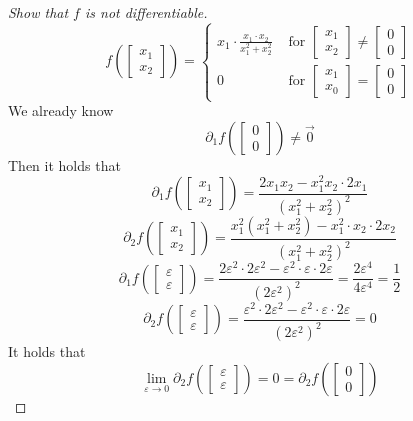 \documentclass[a4paper,landscape,twocolumn]{article}
\theoremstyle{definition}
\begin{document}
\begin{proof}[Show that $f$ is not differentiable]
  \[ f(\begin{bmatrix} x_1 \\ x_2 \end{bmatrix}) = \begin{cases}
    x_1 \cdot \frac{x_1 \cdot x_2}{x_1^2 + x_2^2}  & \text{ for } \begin{bmatrix} x_1 \\ x_2 \end{bmatrix} \neq \begin{bmatrix} 0 \\ 0 \end{bmatrix} \\
    0  & \text{ for } \begin{bmatrix} x_1 \\ x_0 \end{bmatrix} = \begin{bmatrix} 0 \\ 0 \end{bmatrix}
  \end{cases}
  \]
  We already know
  \[ \partial_1 f(\begin{bmatrix} 0 \\ 0 \end{bmatrix}) \neq \vec{0} \]
  Then it holds that
  \[ \partial_1 f(\begin{bmatrix} x_1 \\ x_2 \end{bmatrix}) = \frac{2 x_1 x_2 - x_1^2 x_2 \cdot 2x_1}{(x_1^2 + x_2^2)^2} \]
  \[ \partial_2 f(\begin{bmatrix} x_1 \\ x_2 \end{bmatrix}) = \frac{x_1^2 (x_1^2 + x_2^2) - x_1^2 \cdot x_2 \cdot 2x_2}{(x_1^2 + x_2^2)^2} \]
  \[ \partial_1 f(\begin{bmatrix} \varepsilon \\ \varepsilon \end{bmatrix}) =
    \frac{2 \varepsilon^2 \cdot 2 \varepsilon^2 - \varepsilon^2 \cdot \varepsilon \cdot 2\varepsilon}{(2 \varepsilon^2)^2} = \frac{2\varepsilon^4}{4 \varepsilon^4} = \frac12 \]
  \[ \partial_2 f(\begin{bmatrix} \varepsilon \\ \varepsilon \end{bmatrix}) = \frac{\varepsilon^2 \cdot 2\varepsilon^2 - \varepsilon^2 \cdot \varepsilon \cdot 2\varepsilon}{(2\varepsilon^2)^2} = 0 \]
  It holds that
  \[ \lim_{\varepsilon \to 0} \partial_2 f(\begin{bmatrix} \varepsilon \\ \varepsilon \end{bmatrix}) = 0 = \partial_2 f(\begin{bmatrix} 0 \\ 0 \end{bmatrix}) \]

\end{proof}
\end{document}
